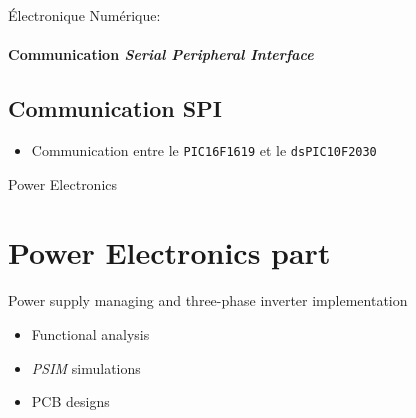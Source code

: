 \documentclass{beamer}
\begin{document}
	\begin{frame}{Électronique Numérique:}
	\framesubtitle{Communication \textit{Serial Peripheral Interface}}
		\subsection[SPI]{Communication SPI}
		\begin{itemize}
		    \item Communication entre le \texttt{PIC16F1619} et le \texttt{dsPIC10F2030}
		\end{itemize}
	\end{frame}
	
	\author[]{Florian POUTHIER}
	\begin{frame}{Power Electronics}
		\section[ENPU]{Power Electronics part}
		Power supply managing and three-phase inverter implementation
 		\begin{itemize}
			\item Functional analysis
			\item \textit{PSIM} simulations
			\item PCB designs
		\end{itemize}
	\end{frame}
	
\end{document}
